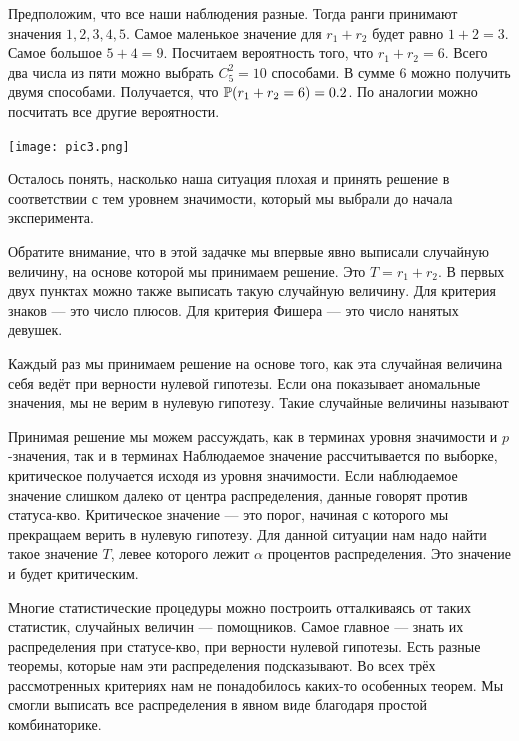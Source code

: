 \documentclass[12pt, a4paper, oneside]{article}
\begin{document}
Предположим, что все наши наблюдения разные. Тогда ранги принимают значения $1,2,3,4,5$. Самое маленькое значение для $r_1 + r_2$ будет равно $1 + 2 = 3.$ Самое большое $5 + 4 = 9$. Посчитаем вероятность того, что $r_1 + r_2 = 6.$ Всего два числа из пяти можно выбрать $C_5^2 = 10$ способами. В сумме $6$ можно получить двумя способами. Получается, что $\mathbb{P}(r_1 + r_2 = 6) = 0.2$. По аналогии можно посчитать все другие вероятности. 

\begin{center} 
\texttt{[image: pic3.png]}
\end{center} 

Осталось понять, насколько наша ситуация плохая и принять решение в соответствии с тем уровнем значимости, который мы выбрали до начала эксперимента. 

Обратите внимание, что в этой задачке мы впервые явно выписали случайную величину, на основе которой мы принимаем решение. Это $T = r_1 + r_2$. В первых двух пунктах можно также выписать такую случайную величину. Для критерия знаков --- это число плюсов. Для критерия Фишера --- это число нанятых девушек. 

Каждый раз мы принимаем решение на основе того, как эта случайная величина себя ведёт при верности нулевой гипотезы. Если она показывает аномальные значения, мы не верим в нулевую гипотезу. Такие случайные величины называют  

Принимая решение мы можем рассуждать, как в терминах уровня значимости и $p$-значения, так и в терминах    Наблюдаемое значение рассчитывается по выборке, критическое получается исходя из уровня значимости. Если наблюдаемое значение слишком далеко от центра распределения, данные говорят против статуса-кво. Критическое значение --- это порог, начиная с которого мы прекращаем верить в нулевую гипотезу. Для данной ситуации нам надо найти такое значение $T$, левее которого лежит $\alpha$ процентов распределения. Это значение и будет критическим. 

Многие статистические процедуры можно построить отталкиваясь от таких статистик,  случайных величин --- помощников. Самое главное --- знать их распределения при статусе-кво, при верности нулевой гипотезы. Есть разные теоремы, которые нам эти распределения подсказывают. Во всех трёх рассмотренных критериях нам не понадобилось каких-то особенных теорем. Мы смогли выписать все распределения в явном виде благодаря простой комбинаторике. 
\end{document}
